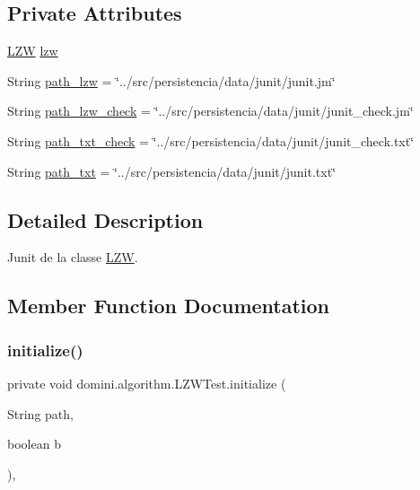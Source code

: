\subsection*{Private Attributes}
\begin{DoxyCompactItemize}
\item 
\hyperlink{classdomini_1_1algorithm_1_1LZW}{L\+ZW} \hyperlink{classdomini_1_1algorithm_1_1LZWTest_a591c1bb9b927631d0e60a2853e502d20}{lzw}
\item 
String \hyperlink{classdomini_1_1algorithm_1_1LZWTest_af5091e6df88845c585e92165f2fae2dc}{path\+\_\+lzw} = \char`\"{}../src/persistencia/data/junit/junit.\+jm\char`\"{}
\item 
String \hyperlink{classdomini_1_1algorithm_1_1LZWTest_a25a37b8cd7cb0756531c39e7ebc60db0}{path\+\_\+lzw\+\_\+check} = \char`\"{}../src/persistencia/data/junit/junit\+\_\+check.\+jm\char`\"{}
\item 
String \hyperlink{classdomini_1_1algorithm_1_1LZWTest_add9dbf2d86413bf9f7bcdd23b268c288}{path\+\_\+txt\+\_\+check} = \char`\"{}../src/persistencia/data/junit/junit\+\_\+check.\+txt\char`\"{}
\item 
String \hyperlink{classdomini_1_1algorithm_1_1LZWTest_a4194ade234060b69729a0380ff4ae33d}{path\+\_\+txt} = \char`\"{}../src/persistencia/data/junit/junit.\+txt\char`\"{}
\end{DoxyCompactItemize}


\subsection{Detailed Description}
Junit de la classe \hyperlink{classdomini_1_1algorithm_1_1LZW}{L\+ZW}. 

\subsection{Member Function Documentation}
\mbox{\label{classdomini_1_1algorithm_1_1LZWTest_acf4cac88aafa2144dc8ce3a80453fa90}} 
\subsubsection{\texorpdfstring{initialize()}{initialize()}}
{\footnotesize\ttfamily private void domini.\+algorithm.\+L\+Z\+W\+Test.\+initialize (\begin{DoxyParamCaption}\item[{String}]{path,  }\item[{boolean}]{b }\end{DoxyParamCaption})\hspace{0.3cm}{\ttfamily [inline]}, {\ttfamily [private]}}



